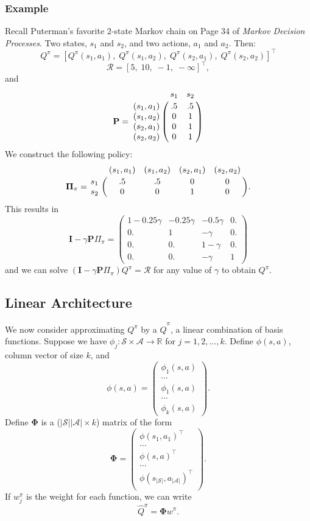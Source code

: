 \documentclass{article}
\newcommand{\bra}[1]{\left[#1\right]}
\newcommand{\abs}[1]{\left|#1\right|}
\newcommand{\R}{\mathbb{R}}
\begin{document}
\subsubsection*{Example} %
\label{ssub:example}
Recall Puterman's favorite 2-state Markov chain on Page 34 of \emph{Markov Decision Processes}. Two states, $s_{1}$ and $s_{2}$, and two actions, $a_{1}$ and $a_{2}$. Then:
\[
	Q^{\pi}=\bra{
		Q^{\pi}(s_{1},a_{1}),\; 
		Q^{\pi}(s_{1},a_{2}),\; 
		Q^{\pi}(s_{2},a_{1}),\; 
		Q^{\pi}(s_{2},a_{2})}^\intercal
\]
\[
	\mathcal{R}=\bra{
		5,\; 
		10,\; 
		-1,\; 
		-\infty}^\intercal,
\]and
\[
	\mathbf{P}=\bordermatrix{
		& s_{1} & s_{2} \cr
		(s_{1},a_{1}) &.5&.5   \cr
		(s_{1},a_{2}) &0&1   \cr
		(s_{2},a_{1}) &0&1   \cr
		(s_{2},a_{2}) &0&1
	}
\]
We construct the following policy:
\[
	\mathbf{\Pi}_{\pi}=\bordermatrix{
	& (s_{1},a_{1}) & (s_{1},a_{2}) & (s_{2},a_{1}) & (s_{2},a_{2}) \cr
	s_{1} &.5&.5&0&0\cr
	s_{2} &0&0&1&0\cr
	}.
\]
This results in 
\[
	\mathbf{I}-\gamma \mathbf{P}\Pi_{\pi}=\left(
	\begin{matrix}
	 1-0.25 \gamma  & -0.25 \gamma  & -0.5 \gamma  & 0. \\
	 0. & 1 & -\gamma  & 0. \\
	 0. & 0. & 1- \gamma  & 0. \\
	 0. & 0. & -\gamma  & 1
	\end{matrix}
	\right)
\]
and we can solve $(\mathbf{I}-\gamma \mathbf{P}\Pi_{\pi})Q^{\pi}=\mathcal{R}$  for any value of $\gamma$ to obtain $Q^{\pi}$. 

\subsection*{Linear Architecture} %
\label{sec:linear_architecture}
We now consider approximating $Q^{\pi}$ by a $\hat{Q}^{\pi}$, a linear combination of basis functions.
Suppose we have $\phi_{j}:\mathcal{S}\times\mathcal{A}\rightarrow \R$ for $j=1,2,\ldots,k$. 
Define $\phi(s,a)$, column vector of size $k$, and
\[
	\phi(s,a)=\left(\begin{smallmatrix}
		\phi_{1}(s,a) \\ \cdots \\ \phi_{1}(s,a) \\ \cdots \\ \phi_{k}(s,a)
	\end{smallmatrix}\right).
\]
Define $\mathbf{\Phi}$ is a ($\abs{\mathcal{S}}\abs{\mathcal{A}}\times k$) matrix of the form
\[
	\mathbf{\Phi}=\begin{pmatrix}
		\phi(s_{1},a_{1})^\intercal\\
		\ldots\\
		\phi(s,a)^\intercal\\
		\ldots\\
		\phi(s_{\abs{\mathcal{S}}},a_{\abs{\mathcal{A}}})^\intercal\\
	\end{pmatrix}.
\]
If $w_{j}^{\pi}$ is the weight for each function, we can write 
\[
	\hat{Q}^{\pi}=\mathbf{\Phi}w^{\pi}.
\]
\end{document}
